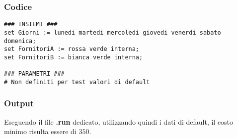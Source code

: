 \subsubsection{Codice}
\begin{lstlisting}
### INSIEMI ###
set Giorni := lunedi martedi mercoledi giovedi venerdi sabato domenica;
set FornitoriA := rossa verde interna;
set FornitoriB := bianca verde interna;

### PARAMETRI ###
# Non definiti per test valori di default
\end{lstlisting}
\subsubsection{Output}
Eseguendo il file \textbf{.run} dedicato, utilizzando quindi i dati di default, il costo minimo risulta essere di \texteuro$350$.